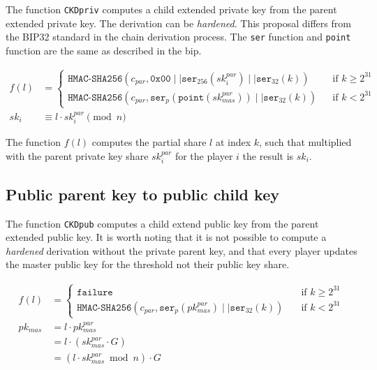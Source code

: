The function \texttt{CKDpriv} computes a child extended private key from the
parent extended private key. The derivation can be \textit{hardened}. This
proposal differs from the BIP32 \cite{HDWallets} standard in the chain
derivation process. The \texttt{ser} function and \texttt{point} function are
the same as described in the \gls{bip}.

\begin{equation*}
\begin{split}
  f(l) &=
  \begin{cases}
    \texttt{HMAC-SHA256}(c_{par}, \texttt{0x00}\mid\mid \texttt{ser}_{256}(sk_i^{par}) \mid\mid \texttt{ser}_{32}(k)) & \quad \text{if } k \geq 2^{31}\\
    \texttt{HMAC-SHA256}(c_{par}, \texttt{ser}_{p}(\texttt{point}(sk_{mas}^{par})) \mid\mid \texttt{ser}_{32}(k)) & \quad \text{if } k < 2^{31}
  \end{cases} \\
  sk_i &\equiv l \cdot sk_i^{par} \pmod n
\end{split}
\end{equation*}

The function $f(l)$ computes the partial share $l$ at index $k$, such that
multiplied with the parent private key share $sk_i^{par}$ for the player $i$ the
result is $sk_i$.

\subsection{Public parent key to public child key}

The function \texttt{CKDpub} computes a child extend public key from the parent
extended public key. It is worth noting that it is not possible to compute a
\textit{hardened} derivation without the private parent key, and
that every player updates the master public key for the threshold not their
public key share.

\begin{equation*}
\begin{split}
  f(l) &=
  \begin{cases}
    \texttt{failure} & \quad \text{if } k \geq 2^{31}\\
    \texttt{HMAC-SHA256}(c_{par}, \texttt{ser}_{p}(pk_{mas}^{par}) \mid\mid \texttt{ser}_{32}(k)) & \quad \text{if } k < 2^{31}
  \end{cases} \\
  pk_{mas} &= l \cdot pk_{mas}^{par}\\
      &= l \cdot (sk_{mas}^{par} \cdot G)\\
      &= (l \cdot sk_{mas}^{par} \bmod n) \cdot G
\end{split}
\end{equation*}

